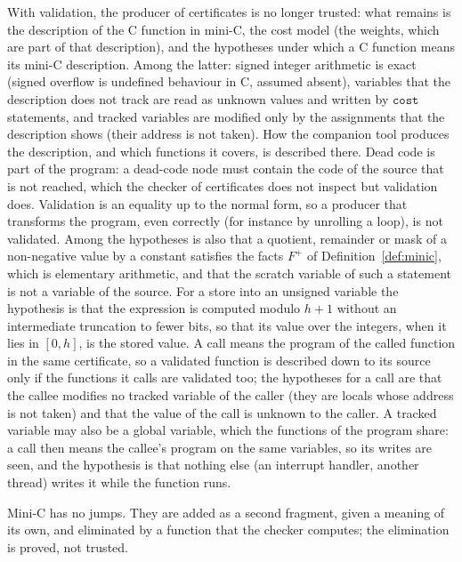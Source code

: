 \documentclass[oneside,english]{amsart}
\numberwithin{equation}{section}
\numberwithin{figure}{section}
\theoremstyle{plain}
\theoremstyle{definition}
\theoremstyle{plain}
\theoremstyle{remark}
\theoremstyle{plain}
\theoremstyle{definition}
\theoremstyle{plain}
\theoremstyle{remark}
\begin{document}
With validation, the producer of certificates is no longer trusted: what remains is the description of the C function in mini-C, the cost model (the weights, which are part of that description), and the hypotheses under which a C function means its mini-C description. Among the latter: signed integer arithmetic is exact (signed overflow is undefined behaviour in C, assumed absent), variables that the description does not track are read as unknown values and written by $\mathtt{cost}$ statements, and tracked variables are modified only by the assignments that the description shows (their address is not taken). How the companion tool \cite{crosscheckTool} produces the description, and which functions it covers, is described there. Dead code is part of the program: a dead-code node must contain the code of the source that is not reached, which the checker of certificates does not inspect but validation does. Validation is an equality up to the normal form, so a producer that transforms the program, even correctly (for instance by unrolling a loop), is not validated. Among the hypotheses is also that a quotient, remainder or mask of a non-negative value by a constant satisfies the facts $F^{+}$ of Definition~\ref{def:minic}, which is elementary arithmetic, and that the scratch variable of such a statement is not a variable of the source. For a store into an unsigned variable the hypothesis is that the expression is computed modulo $h + 1$ without an intermediate truncation to fewer bits, so that its value over the integers, when it lies in $[0, h]$, is the stored value. A call means the program of the called function in the same certificate, so a validated function is described down to its source only if the functions it calls are validated too; the hypotheses for a call are that the callee modifies no tracked variable of the caller (they are locals whose address is not taken) and that the value of the call is unknown to the caller. A tracked variable may also be a global variable, which the functions of the program share: a call then means the callee's program on the same variables, so its writes are seen, and the hypothesis is that nothing else (an interrupt handler, another thread) writes it while the function runs.

Mini-C has no jumps. They are added as a second fragment, given a meaning of its own, and eliminated by a function that the checker computes; the elimination is proved, not trusted.
\end{document}
